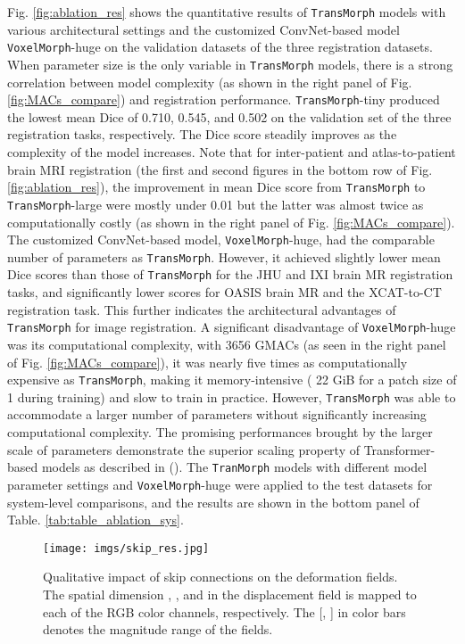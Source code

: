 \documentclass[times,twocolumn,final]{elsarticle}
\begin{document}
Fig. \ref{fig:ablation_res} shows the quantitative results of \texttt{TransMorph} models with various architectural settings and the customized ConvNet-based model \texttt{VoxelMorph}-huge on the validation datasets of the three registration datasets. When parameter size is the only variable in \texttt{TransMorph} models, there is a strong correlation between model complexity (as shown in the right panel of Fig. \ref{fig:MACs_compare}) and registration performance. \texttt{TransMorph}-tiny produced the lowest mean Dice of 0.710, 0.545, and 0.502 on the validation set of the three registration tasks, respectively. The Dice score steadily improves as the complexity of the model increases. Note that for inter-patient and atlas-to-patient brain MRI registration (the first and second figures in the bottom row of Fig. \ref{fig:ablation_res}), the improvement in mean Dice score from \texttt{TransMorph} to \texttt{TransMorph}-large were mostly under 0.01 but the latter was almost twice as computationally costly (as shown in the right panel of Fig. \ref{fig:MACs_compare}). The customized ConvNet-based model, \texttt{VoxelMorph}-huge, had the comparable number of parameters as \texttt{TransMorph}. However, it achieved slightly lower mean Dice scores than those of \texttt{TransMorph} for the JHU and IXI brain MR registration tasks, and significantly lower scores for OASIS brain MR and the XCAT-to-CT registration task. This further indicates the architectural advantages of \texttt{TransMorph} for image registration. A significant disadvantage of \texttt{VoxelMorph}-huge was its computational complexity, with 3656 GMACs (as seen in the right panel of Fig. \ref{fig:MACs_compare}), it was nearly five times as computationally expensive as \texttt{TransMorph}, making it memory-intensive ( 22 GiB for a patch size of 1 during training) and slow to train in practice. However, \texttt{TransMorph} was able to accommodate a larger number of parameters without significantly increasing computational complexity. The promising performances brought by the larger scale of parameters demonstrate the superior scaling property of Transformer-based models as described in (\cite{zhai2022scaling, liu2022convnet}). The \texttt{TranMorph} models with different model parameter settings and \texttt{VoxelMorph}-huge were applied to the test datasets for system-level comparisons, and the results are shown in the bottom panel of Table. \ref{tab:table_ablation_sys}.


\begin{figure}[!h]
\centering
\texttt{[image: imgs/skip\_res.jpg]}
\caption{Qualitative impact of skip connections on the deformation fields. The spatial dimension , , and  in the displacement field is mapped to each of the RGB color channels, respectively. The [, ] in color bars denotes the magnitude range of the fields.\label{fig:skip_res}}
\end{figure}
\end{document}
